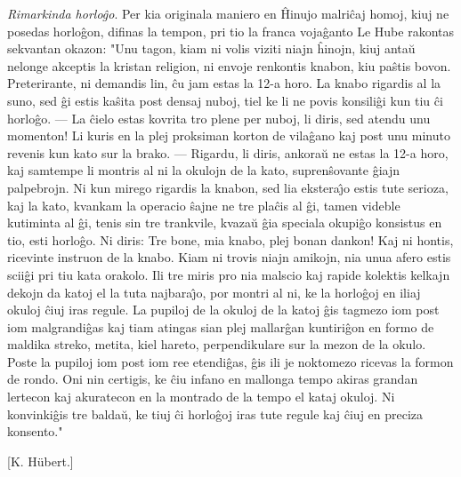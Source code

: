 
\emph{Rimarkinda horlo\^go}. Per kia originala maniero en \^Hinujo
malri\^caj homoj, kiuj ne posedas horlo\^gon, difinas la tempon, pri
tio la franca voja\^ganto Le Hube rakontas sekvantan okazon: "Unu
tagon, kiam ni volis viziti niajn \^hinojn, kiuj anta\u u nelonge
akceptis la kristan religion, ni envoje renkontis knabon, kiu
pa\^stis bovon. Preterirante, ni demandis lin, \^cu jam estas la
12-a horo. La knabo rigardis al la suno, sed \^gi estis ka\^sita
post densaj nuboj, tiel ke li ne povis konsili\^gi kun tiu \^ci
horlo\^go. --- La \^cielo estas kovrita tro plene per nuboj, li
diris, sed atendu unu momenton! Li kuris en la plej proksiman korton
de vila\^gano kaj post unu minuto revenis kun kato sur la brako. ---
Rigardu, li diris, ankora\u u ne estas la 12-a horo, kaj samtempe li
montris al ni la okulojn de la kato, supren\^sovante \^giajn
palpebrojn. Ni kun mirego rigardis la knabon, sed lia ekstera\^{\j}o
estis tute serioza, kaj la kato, kvankam la operacio \^sajne ne tre
pla\^cis al \^gi, tamen videble kutiminta al \^gi, tenis sin tre
trankvile, kvaza\u u \^gia speciala okupi\^go konsistus en tio, esti
horlo\^go. Ni diris: Tre bone, mia knabo, plej bonan dankon! Kaj ni
hontis, ricevinte instruon de la knabo. Kiam ni trovis niajn
amikojn, nia unua afero estis scii\^gi pri tiu kata orakolo. Ili tre
miris pro nia malscio kaj rapide kolektis kelkajn dekojn da katoj el
la tuta najbara\^{\j}o, por montri al ni, ke la horlo\^goj en iliaj
okuloj \^ciuj iras regule. La pupiloj de la okuloj de la katoj \^gis
tagmezo iom post iom malgrandi\^gas kaj tiam atingas sian plej
mallar\^gan kuntiri\^gon en formo de maldika streko, metita, kiel
hareto, perpendikulare sur la mezon de la okulo. Poste la pupiloj
iom post iom ree etendi\^gas, \^gis ili je noktomezo ricevas la
formon de rondo. Oni nin certigis, ke \^ciu infano en mallonga tempo
akiras grandan lertecon kaj akuratecon en la montrado de la tempo el
kataj okuloj. Ni konvinki\^gis tre balda\u u, ke tiuj \^ci
horlo\^goj iras tute regule kaj \^ciuj en preciza konsento."

\begin{flushright}
\footnotesize [K. Hübert.]
\end{flushright}

